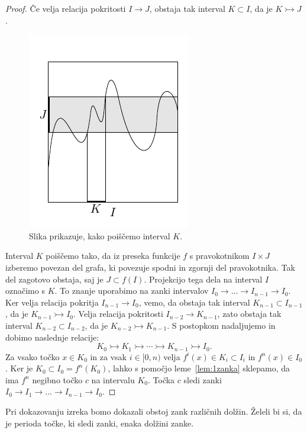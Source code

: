 \documentclass[mat2]{fmfdelo}
\begin{document}
\begin{proof}
Če velja relacija pokritosti $I \to J$, obstaja tak interval $K \subset I$, da je $K \rightarrowtail J$.
\begin{figure}[h]
  \centering
  \includegraphics[]{images/bezje.pdf}
  \caption[Primer vektorske slike.]{Slika prikazuje, kako poiščemo interval $K$.}
  \label{fig:bezje}
\end{figure}
Interval $K$ poiščemo tako, da iz preseka funkcije $f$ s pravokotnikom $I \times J$ izberemo povezan del grafa, ki povezuje spodni in zgornji del pravokotnika. Tak del zagotovo obstaja, saj je $J \subset f(I)$. Projekcijo tega dela na interval $I$ označimo s $K$. To znanje uporabimo na zanki intervalov $I_0 \to \dots \to I_{n-1} \to I_0$. Ker velja relacija pokritja $I_{n-1} \to I_0$, vemo, da obstaja tak interval $K_{n-1} \subset I_{n-1}$, da je $K_{n-1} \rightarrowtail I_0$. Velja relacija pokritosti $I_{n-2} \to K_{n-1}$, zato obstaja tak interval $K_{n-2} \subset I_{n-2}$, da je $K_{n-2} \rightarrowtail K_{n-1}$. S postopkom nadaljujemo in dobimo naslednje relacije:
$$K_0 \rightarrowtail K_1 \rightarrowtail \cdots \rightarrowtail K_{n-1} \rightarrowtail I_0.$$
Za vsako točko $x \in K_0$ in za vsak $i \in [0, n)$ velja $f^i(x) \in K_i \subset I_i$ in $f^n(x) \in I_0$. Ker je $K_0 \subset I_0 = f^n(K_0)$, lahko s pomočjo leme~\ref{lem:1zanka} sklepamo, da ima $f^n$ negibno točko $c$ na intervalu $K_0$. Točka $c$ sledi zanki $I_0 \to I_1 \to \dots \to I_{n-1} \to I_0$.
\end{proof}

Pri dokazovanju izreka bomo dokazali obstoj zank različnih dolžin. Želeli bi si, da je perioda točke, ki sledi zanki, enaka dolžini zanke. 
\end{document}
